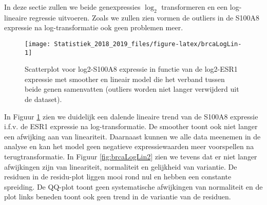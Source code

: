 \documentclass[12pt,dutch,coursenotes]{book}
\newenvironment{Shaded}{\begin{snugshade}}{\end{snugshade}}
\newcommand{\KeywordTok}[1]{\textcolor[rgb]{0.13,0.29,0.53}{\textbf{#1}}}
\newcommand{\DataTypeTok}[1]{\textcolor[rgb]{0.13,0.29,0.53}{#1}}
\newcommand{\DecValTok}[1]{\textcolor[rgb]{0.00,0.00,0.81}{#1}}
\newcommand{\StringTok}[1]{\textcolor[rgb]{0.31,0.60,0.02}{#1}}
\newcommand{\OperatorTok}[1]{\textcolor[rgb]{0.81,0.36,0.00}{\textbf{#1}}}
\newcommand{\NormalTok}[1]{#1}
\theoremstyle{definition}
\theoremstyle{definition}
\theoremstyle{definition}
\theoremstyle{remark}
\begin{document}
In deze sectie zullen we beide genexpressies \(\log_2\) transformeren en
een log-lineaire regressie uitvoeren. Zoals we zullen zien vormen de
outliers in de S100A8 expressie na log-transformatie ook geen problemen
meer.

\begin{Shaded}
\end{Shaded}

\begin{figure}

{\centering \texttt{[image: Statistiek\_2018\_2019\_files/figure-latex/brcaLogLin-1]} 

}

\caption{Scatterplot voor log2-S100A8 expressie in functie van de log2-ESR1 expressie met smoother en lineair model die het verband tussen beide genen samenvatten (outliers worden niet langer verwijderd uit de dataset).}\label{fig:brcaLogLin}
\end{figure}

In Figuur \ref{fig:brcaLogLin} zien we duidelijk een dalende lineaire
trend van de S100A8 expressie i.f.v. de ESR1 expressie na
log-transformatie. De smoother toont ook niet langer een afwijking aan
van lineariteit. Daarnaast kunnen we alle data meenemen in de analyse en
kan het model geen negatieve expressiewaarden meer voorspellen na
terugtransformatie. In Figuur \ref{fig:brcaLogLin2} zien we tevens dat
er niet langer afwijkingen zijn van lineariteit, normaliteit en
gelijkheid van variantie. De residuen in de residu-plot liggen mooi rond
nul en hebben een constante spreiding. De QQ-plot toont geen
systematische afwijkingen van normaliteit en de plot links beneden toont
ook geen trend in de variantie van de residuen.
\end{document}
